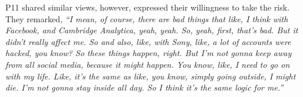     P11 shared similar views, however, expressed their willingness to take the risk. They remarked, 
            \textit{``I mean, of course, there are bad things that like, I think with Facebook, and Cambridge Analytica, yeah, yeah. So, yeah, first, that's bad. But it didn't really affect me. So and also, like, with Sony, like, a lot of accounts were hacked, you know? So these things happen, right. But I'm not gonna keep away from all social media, because it might happen. You know, like, I need to go on with my life. Like, it's the same as like, you know, simply going outside, I might die. I'm not gonna stay inside all day. So I think it's the same logic for me.''}
    	
